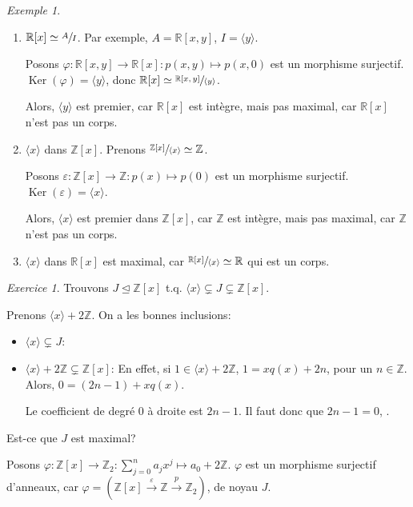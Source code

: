 \documentclass{report}
\theoremstyle{definition}
\theoremstyle{remark}
\newtheorem*{exem}{Exemple}
\newtheorem*{exer}{Exercice}
\def\ZZ{\mathbb{Z}}
\def\RR{\mathbb{R}}
\def\noyau{\operatorname{Ker}}
\begin{document}
	\begin{exem}
		\begin{enumerate}
			\item $\RR[x] \simeq \sfrac{A}{I}$. Par exemple, $A=\RR[x,y]$, $I=\langle y \rangle$.

			Posons $\varphi : \RR[x,y]\to\RR[x] : p(x,y)\mapsto p(x,0)$ est un morphisme surjectif. $\noyau(\varphi)=\langle y \rangle$, donc $\RR[x] \simeq \sfrac{\RR[x,y]}{\langle y \rangle}$.

			Alors, $\langle y \rangle$ est premier, car $\RR[x]$ est int\`egre, mais pas maximal, car $\RR[x]$ n'est pas un corps.
			\item $\langle x \rangle$ dans $\ZZ[x]$. Prenons $\sfrac{\ZZ[x]}{\langle x \rangle} \simeq \ZZ$.

			Posons $\varepsilon : \ZZ[x]\to\ZZ : p(x)\mapsto p(0)$ est un morphisme surjectif. $\noyau(\varepsilon)=\langle x \rangle$.

			Alors, $\langle x \rangle$ est premier dans $\ZZ[x]$, car $\ZZ$ est int\`egre, mais pas maximal, car $\ZZ$ n'est pas un corps.
			\item $\langle x \rangle$ dans $\RR[x]$ est maximal, car $\sfrac{\RR[x]}{\langle x \rangle} \simeq \RR$ qui est un corps.
		\end{enumerate}
	\end{exem}

	\begin{exer}
		Trouvons $J\trianglelefteq\ZZ[x]$ t.q. $\langle x \rangle \subsetneq J \subsetneq \ZZ[x]$.

		Prenons $\langle x \rangle + 2\ZZ$. On a les bonnes inclusions:
		\begin{itemize}
			\item $\langle x \rangle \subsetneq J$: \checkmark
			\item $\langle x \rangle + 2\ZZ \subsetneq \ZZ[x]$: En effet, si $1\in \langle x \rangle + 2\ZZ$, $1=xq(x)+2n$, pour un $n\in\ZZ$. Alors, $0=(2n-1)+xq(x)$.

			Le coefficient de degr\'e 0 \`a droite est $2n-1$. Il faut donc que $2n-1=0$, \lightning.
		\end{itemize}

		Est-ce que $J$ est maximal?

		Posons $\varphi : \ZZ[x]\to\ZZ_2 : \sum_{j=0}^{n} a_jx^j\mapsto a_0+2\ZZ$. $\varphi$ est un morphisme surjectif d'anneaux, car $\varphi = (\ZZ[x] \xrightarrow{\varepsilon} \ZZ \xrightarrow{p} \ZZ_2)$, de noyau $J$.
	\end{exer}
\end{document}
